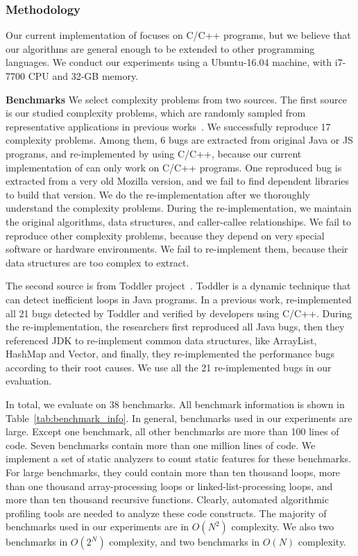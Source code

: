 \subsubsection{Methodology}
Our current implementation of \Tool focuses on C/C++ programs, 
but we believe that our algorithms are general enough to be extended 
to other programming languages.
We conduct our experiments using a Ubuntu-16.04 machine, 
with i7-7700 CPU and 32-GB memory. 


%

\textbf{Benchmarks}
We select complexity problems from two sources. 
The first source is our studied complexity problems, 
which are randomly sampled from representative applications in previous works~\cite{PerfBug,SongOOPSLA2014}.
We successfully reproduce 17 complexity problems. 
Among them, 6 bugs are extracted from original Java or JS programs, 
and re-implemented by using C/C++, 
because our current implementation of \Tool can only work on C/C++ programs.
One reproduced bug is extracted from a very old Mozilla version, 
and we fail to find dependent libraries to build that version. 
We do the re-implementation after we thoroughly understand the complexity problems.
During the re-implementation, we maintain the original algorithms, 
data structures, and caller-callee relationships. 
We fail to reproduce other complexity problems, 
because they depend on very special software or hardware environments.
We fail to re-implement them, 
because their data structures are too complex to extract.

The second source is from Toddler project~\cite{Alabama}. 
Toddler is a dynamic technique that can detect inefficient loops in Java programs.
In a previous work, \citet{ldoctor} re-implemented all 
21 bugs detected by Toddler and verified by developers using C/C++.
During the re-implementation, the researchers first reproduced all Java bugs, 
then they referenced JDK to re-implement 
common data structures, like ArrayList, HashMap and Vector, 
and finally, they re-implemented the performance bugs according to their root causes. 
We use all the 21 re-implemented bugs in our evaluation.  

In total, we evaluate \Tool on 38 benchmarks. 
All benchmark information is shown in Table~\ref{tab:benchmark_info}.
In general, benchmarks used in our experiments are large. 
Except one benchmark, all other benchmarks are more than 100 lines of code. 
Seven benchmarks contain more than one million lines of code. 
We implement a set of static analyzers to count static features for these benchmarks. 
For large benchmarks, 
they could contain more than ten thousand loops, more than one 
thousand array-processing loops or linked-list-processing loops, 
and more than ten thousand recursive functions. 
Clearly, automated algorithmic profiling tools are needed to analyze these code constructs. 
The majority of benchmarks used in our experiments are in $O(N^2)$ complexity. 
We also two benchmarks in $O(2^N)$ complexity, 
and two benchmarks in $O(N)$ complexity. 

